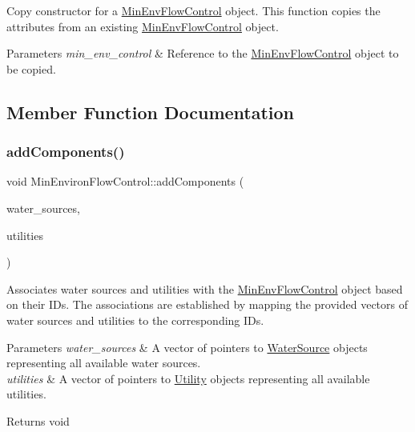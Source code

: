 Copy constructor for a {\ttfamily \mbox{\hyperlink{classMinEnvFlowControl}{Min\+Env\+Flow\+Control}}} object. This function copies the attributes from an existing {\ttfamily \mbox{\hyperlink{classMinEnvFlowControl}{Min\+Env\+Flow\+Control}}} object. 


\begin{DoxyParams}{Parameters}
{\em min\+\_\+env\+\_\+control} & Reference to the {\ttfamily \mbox{\hyperlink{classMinEnvFlowControl}{Min\+Env\+Flow\+Control}}} object to be copied. \\
\hline
\end{DoxyParams}


\subsection{Member Function Documentation}
\mbox{\label{classMinEnvironFlowControl_a9dd9d33661f121dda9704288658ecf7e}} 
\subsubsection{\texorpdfstring{add\+Components()}{addComponents()}}
{\footnotesize\ttfamily void Min\+Environ\+Flow\+Control\+::add\+Components (\begin{DoxyParamCaption}\item[{vector$<$ \mbox{\hyperlink{classWaterSource}{Water\+Source}} $\ast$$>$}]{water\+\_\+sources,  }\item[{vector$<$ \mbox{\hyperlink{classUtility}{Utility}} $\ast$$>$}]{utilities }\end{DoxyParamCaption})}



Associates water sources and utilities with the {\ttfamily \mbox{\hyperlink{classMinEnvFlowControl}{Min\+Env\+Flow\+Control}}} object based on their I\+Ds. The associations are established by mapping the provided vectors of water sources and utilities to the corresponding I\+Ds. 


\begin{DoxyParams}{Parameters}
{\em water\+\_\+sources} & A vector of pointers to {\ttfamily \mbox{\hyperlink{classWaterSource}{Water\+Source}}} objects representing all available water sources. \\
\hline
{\em utilities} & A vector of pointers to {\ttfamily \mbox{\hyperlink{classUtility}{Utility}}} objects representing all available utilities.\\
\hline
\end{DoxyParams}
\begin{DoxyReturn}{Returns}
void 
\end{DoxyReturn}
\mbox{\label{classMinEnvironFlowControl_ac7357455a533f7e6882cdb1ef303359b}} 
